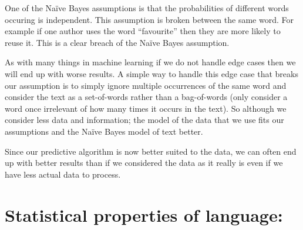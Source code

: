 \documentclass[10pt,\jkfside,a4paper]{article}
\begin{document}
\begin{enumerate}
One of the Na\"ive Bayes assumptions is that the probabilities of different words occuring 
is independent. This assumption is broken between the same word. For example if one author 
uses the word ``favourite'' then they are more likely to reuse it. This is a clear breach 
of the Na\"ive Bayes assumption. 

As with many things in machine learning if we do not handle edge cases then we will end up 
with worse results. A simple way to handle this edge case that breaks our assumption 
is to simply ignore multiple occurrences of the same word and consider the text as a 
set-of-words rather than a bag-of-words (only consider a word once irrelevant of how many 
times it occurs in the text). So although we consider less data and information; 
the model of the data that we use fits our assumptions and the Na\"ive Bayes model of text 
better.

Since our predictive algorithm is now better suited to the data, we can often end up with 
better results than if we considered the data as it really is even if we have less actual 
data to process.

\end{enumerate}

\section{Statistical properties of language:}
\end{document}
